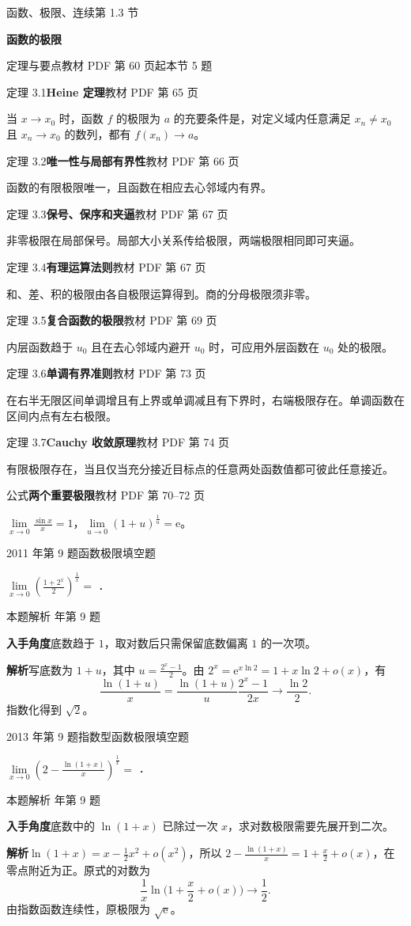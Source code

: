 \documentclass[UTF8,zihao=-4,fontset=fandol]{ctexart}
\renewcommand{\lim}{\operatorname*{lim}\limits}
\newcommand{\SectionHeading}[4]{%
  \clearpage\hypertarget{sec-#1}{}%
  {\small\textcolor{accent}{#2\hfill 第 #1 节}}\par\medskip
  {\LARGE\bfseries #3}\par\smallskip
  {\small\textcolor{muted}{#4}}\par\bigskip}
\newcommand{\Theory}[4]{%
  {\small\textcolor{accent}{#1}\quad\textbf{#3}\hfill\textcolor{muted}{教材 PDF 第 #2 页}}\par
  {\small #4}\par\smallskip}
\newcommand{\blank}{\underline{\hspace{5em}}}
\newcommand{\QuestionPage}[6]{%
  \par\noindent\begin{minipage}{\linewidth}
  \raggedright
  {\small\textcolor{black!60}{#3\quad #5}\hfill\textcolor{accent}{#2}}\par\smallskip}
\newcommand{\QuestionEnd}{\end{minipage}\par\medskip}
\newcommand{\QuestionPage}[6]{%
  \clearpage
  {\small\textcolor{accent}{#1\hfill #2}}\par\medskip
  {\small\textcolor{black!60}{#3\quad #5\hfill #6}}\par\vspace{9bp}}
\newcommand{\QuestionEnd}{}
\newenvironment{QuestionSolution}[1]{%
  \clearpage
  {\small\textcolor{black!60}{本题解析\quad #1}}\par\medskip
}{\par\clearpage}
\begin{document}
\SectionHeading{1.3}{函数、极限、连续}{函数的极限}{定理与要点\quad 教材 PDF 第 60 页起\hfill 本节 5 题}
\Theory{定理 3.1}{65}{Heine 定理}{当 \(x\to x_0\) 时，函数 \(f\) 的极限为 \(a\) 的充要条件是，对定义域内任意满足 \(x_n\ne x_0\) 且 \(x_n\to x_0\) 的数列，都有 \(f(x_n)\to a\)。}
\Theory{定理 3.2}{66}{唯一性与局部有界性}{函数的有限极限唯一，且函数在相应去心邻域内有界。}
\Theory{定理 3.3}{67}{保号、保序和夹逼}{非零极限在局部保号。局部大小关系传给极限，两端极限相同即可夹逼。}
\Theory{定理 3.4}{67}{有理运算法则}{和、差、积的极限由各自极限运算得到。商的分母极限须非零。}
\Theory{定理 3.5}{69}{复合函数的极限}{内层函数趋于 \(u_0\) 且在去心邻域内避开 \(u_0\) 时，可应用外层函数在 \(u_0\) 处的极限。}
\Theory{定理 3.6}{73}{单调有界准则}{在右半无限区间单调增且有上界或单调减且有下界时，右端极限存在。单调函数在区间内点有左右极限。}
\Theory{定理 3.7}{74}{Cauchy 收敛原理}{有限极限存在，当且仅当充分接近目标点的任意两处函数值都可彼此任意接近。}
\Theory{公式}{70--72}{两个重要极限}{\(\lim_{x\to0}\frac{\sin x}{x}=1\)，\(\lim_{u\to0}(1+u)^{\frac{1}{u}}=\mathrm{e}\)。}
\QuestionPage{1.3 函数的极限}{填空题}{2011 年第 9 题}{1}{函数极限}{012 / 234}
$\lim_{x \to 0} \left(\frac{1 + 2^x}{2} \right)^{\frac{1}{x}} =$ \blank{}．
\QuestionEnd

\begin{QuestionSolution}{2011 年第 9 题}
\textbf{入手角度}\quad 底数趋于 \(1\)，取对数后只需保留底数偏离 \(1\) 的一次项。

\textbf{解析}\quad 写底数为 \(1+u\)，其中 \(u=\frac{2^x-1}{2}\)。由 \(2^x=\mathrm{e}^{x\ln 2}=1+x\ln 2+o(x)\)，有
\[
\frac{\ln(1+u)}{x}
=\frac{\ln(1+u)}u\frac{2^x-1}{2x}
\longrightarrow \frac{\ln 2}2.
\]
指数化得到 \(\boxed{\sqrt2}\)。
\end{QuestionSolution}

\QuestionPage{1.3 函数的极限}{填空题}{2013 年第 9 题}{2}{指数型函数极限}{013 / 234}
$\lim_{x \to 0} \left(2 - \frac{\ln(1 + x)}{x} \right)^{\frac{1}{x}} =$ \blank{}．
\QuestionEnd

\begin{QuestionSolution}{2013 年第 9 题}
\textbf{入手角度}\quad 底数中的 \(\ln(1+x)\) 已除过一次 \(x\)，求对数极限需要先展开到二次。

\textbf{解析}\quad \(\ln(1+x)=x-\tfrac12x^2+o(x^2)\)，所以 \(2-\frac{\ln(1+x)}{x}=1+\frac{x}{2}+o(x)\)，在零点附近为正。原式的对数为
\[
\frac{1}{x}\ln\bigl(1+\frac{x}{2}+o(x)\bigr)\longrightarrow\frac12.
\]
由指数函数连续性，原极限为 \(\boxed{\sqrt{\mathrm{e}}}\)。
\end{QuestionSolution}
\end{document}
